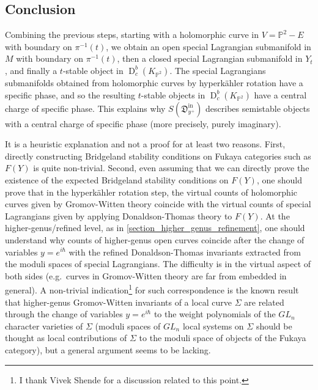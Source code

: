\documentclass[11pt,letterpaper]{amsart}
\newcommand\PP{\mathbb P}
\newcommand\fD{\mathfrak D}
\newcommand\D{\operatorname{D}}
\newcommand\iin{\mathrm{in}}
\begin{document}
\subsection{Conclusion}
Combining the previous steps, starting with a
holomorphic curve in $V=\PP^2-E$ with boundary on 
$\pi^{-1}(t)$, we obtain an open special Lagrangian submanifold in $M$ with boundary on $\pi^{-1}(t)$, then a closed special Lagrangian submanifold in $Y_t$, and finally a
$t$-stable object in $\D^b_c(K_{\PP^2})$.
The special Lagrangians submanifolds obtained from holomorphic curves by hyperkähler rotation have a specific phase, 
and so the resulting $t$-stable objects in 
$\D^b_c(K_{\PP^2})$ have a central charge of specific phase. This explains why 
$S(\fD^{\iin}_{y^+})$ describes semistable objects with a central charge of specific phase (more precisely, purely imaginary).


It is a heuristic explanation and not a proof for at least two reasons.
First, directly constructing Bridgeland stability conditions on Fukaya categories such as $F(Y)$ is quite non-trivial.
Second, even assuming that we can directly prove the existence of the expected Bridgeland stability conditions on $F(Y)$, one should prove that in the hyperkähler rotation step, the virtual counts of holomorphic curves given by Gromov-Witten theory coincide with the virtual counts of special Lagrangians given by applying Donaldson-Thomas theory to $F(Y)$. At the higher-genus/refined level, as in  \cref{section_higher_genus_refinement}, one should understand why counts of higher-genus open curves coincide after the change of variables $y=e^{i\hbar}$ with the refined Donaldson-Thomas invariants extracted from the moduli spaces of special Lagrangians. 
The difficulty is in the virtual aspect of both sides (e.g.\ curves in Gromov-Witten theory are far from embedded in general). A non-trivial indication\footnote{I thank Vivek Shende for a discussion related to this point.} for such correspondence is the known result
\cite{MR2350052, MR2453601, MR3221294} that higher-genus Gromov-Witten invariants of a local curve $\Sigma$ are related through the change of variables 
$y=e^{i\hbar}$ to the weight polynomials of the $GL_n$ character varieties of $\Sigma$ (moduli spaces of $GL_n$ local systems on $\Sigma$ should be thought as local contributions of 
$\Sigma$ to the moduli space of objects 
of the Fukaya category), but a general argument seems to be lacking.


\newpage
\end{document}
